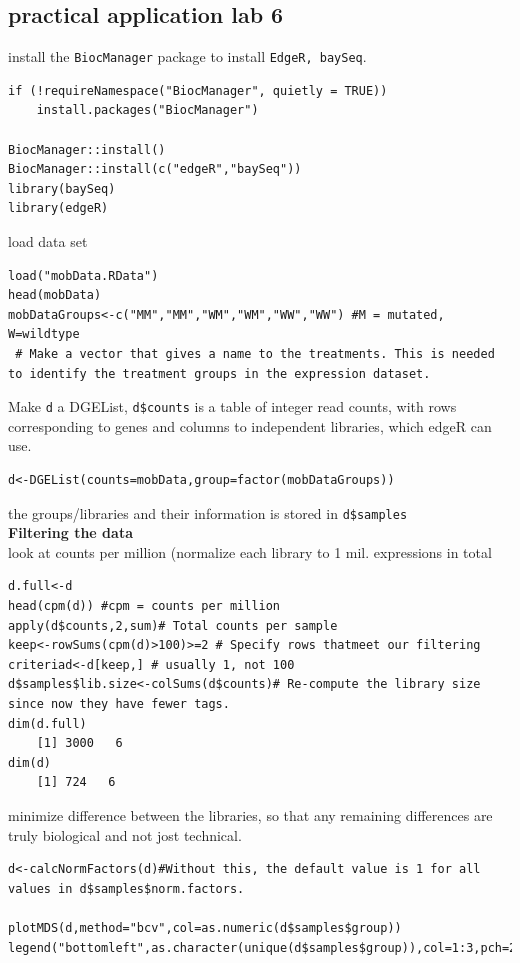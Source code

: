 \documentclass{article}
\begin{document}
\subsection{practical application lab 6}
install the \texttt{BiocManager} package to install \texttt{EdgeR, baySeq}.
\begin{lstlisting}
if (!requireNamespace("BiocManager", quietly = TRUE))
	install.packages("BiocManager")

BiocManager::install()
BiocManager::install(c("edgeR","baySeq"))
library(baySeq)
library(edgeR)
\end{lstlisting}
load data set 
\begin{lstlisting}
load("mobData.RData")
head(mobData)
mobDataGroups<-c("MM","MM","WM","WM","WW","WW") #M = mutated, W=wildtype
 # Make a vector that gives a name to the treatments. This is needed to identify the treatment groups in the expression dataset.
\end{lstlisting}
Make \texttt{d} a DGEList, \texttt{d\$counts} is a table of integer read counts, with rows corresponding to genes and columns to independent libraries, which edgeR can use.\par 
\begin{lstlisting}
d<-DGEList(counts=mobData,group=factor(mobDataGroups)) 
\end{lstlisting}
the groups/libraries and their information is stored in \texttt{d\$samples}\\
\textbf{Filtering the data}\\
look at counts per million (normalize each library to 1 mil. expressions in total
\begin{lstlisting}
d.full<-d
head(cpm(d)) #cpm = counts per million
apply(d$counts,2,sum)# Total counts per sample
keep<-rowSums(cpm(d)>100)>=2 # Specify rows thatmeet our filtering criteriad<-d[keep,] # usually 1, not 100
d$samples$lib.size<-colSums(d$counts)# Re-compute the library size since now they have fewer tags.
dim(d.full) 
	[1] 3000   6
dim(d)
	[1] 724   6
\end{lstlisting}

minimize difference between the libraries, so that any remaining differences are truly biological and not jost technical.

\begin{lstlisting}
d<-calcNormFactors(d)#Without this, the default value is 1 for all values in d$samples$norm.factors.

plotMDS(d,method="bcv",col=as.numeric(d$samples$group))
legend("bottomleft",as.character(unique(d$samples$group)),col=1:3,pch=20)
\end{lstlisting}
\end{document}
